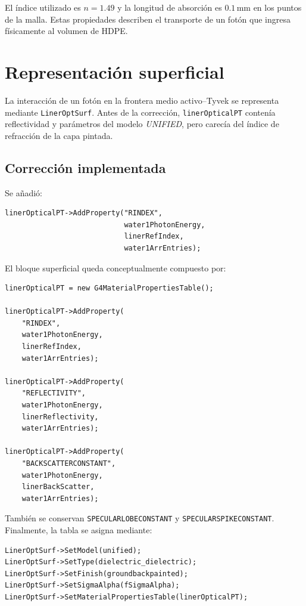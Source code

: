 \documentclass[11pt,a4paper]{article}
\newcommand{\codigo}[1]{\nolinkurl{#1}}
\begin{document}
El índice utilizado es $n=1.49$ y la longitud de absorción es
$0.1\,\mathrm{mm}$ en los puntos de la malla. Estas propiedades describen el
transporte de un fotón que ingresa físicamente al volumen de HDPE.

\section{Representación superficial}

La interacción de un fotón en la frontera medio activo--Tyvek se representa
mediante \codigo{LinerOptSurf}. Antes de la corrección,
\codigo{linerOpticalPT} contenía reflectividad y parámetros del modelo
\textit{UNIFIED}, pero carecía del índice de refracción de la capa pintada.

\subsection{Corrección implementada}

Se añadió:

\begin{lstlisting}
linerOpticalPT->AddProperty("RINDEX",
                            water1PhotonEnergy,
                            linerRefIndex,
                            water1ArrEntries);
\end{lstlisting}

El bloque superficial queda conceptualmente compuesto por:

\begin{lstlisting}
linerOpticalPT = new G4MaterialPropertiesTable();

linerOpticalPT->AddProperty(
    "RINDEX",
    water1PhotonEnergy,
    linerRefIndex,
    water1ArrEntries);

linerOpticalPT->AddProperty(
    "REFLECTIVITY",
    water1PhotonEnergy,
    linerReflectivity,
    water1ArrEntries);

linerOpticalPT->AddProperty(
    "BACKSCATTERCONSTANT",
    water1PhotonEnergy,
    linerBackScatter,
    water1ArrEntries);
\end{lstlisting}

También se conservan \codigo{SPECULARLOBECONSTANT} y
\codigo{SPECULARSPIKECONSTANT}. Finalmente, la tabla se asigna mediante:

\begin{lstlisting}
LinerOptSurf->SetModel(unified);
LinerOptSurf->SetType(dielectric_dielectric);
LinerOptSurf->SetFinish(groundbackpainted);
LinerOptSurf->SetSigmaAlpha(fSigmaAlpha);
LinerOptSurf->SetMaterialPropertiesTable(linerOpticalPT);
\end{lstlisting}
\end{document}
